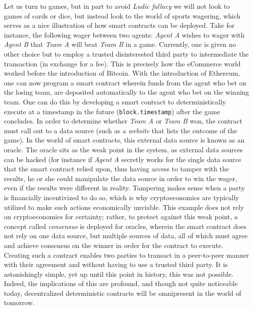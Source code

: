 \documentclass{article}
\begin{document}
Let us turn to games, but in part to avoid \textit{Ludic fallacy} we will not look to games of cards or dice, but instead look to the world of sports wagering, which serves as a nice illustration of how smart contracts can be deployed. Take for instance, the following wager between two agents: \textit{Agent A} wishes to wager with \textit{Agent B} that \textit{Team A} will beat \textit{Team B} in a game. Currently, one is given no other choice but to employ a trusted disinterested third party to intermediate the transaction (in exchange for a fee). This is precisely how the eCommerce world worked before the introduction of Bitcoin. With the introduction of Ethereum, one can now program a smart contract wherein funds from the agent who bet on the losing team, are deposited automatically to the agent who bet on the winning team. One can do this by developing a smart contract to deterministically execute at a timestamp in the future (\texttt{block.timestamp}) after the game concludes. In order to determine whether \textit{Team A} or \textit{Team B} won, the contract must call out to a data source (such as a \textit{website} that lists the outcome of the game). In the world of smart contracts, this external data source is known as an \gls{oracle}. The oracle sits as the weak point in the system, as external data sources can be hacked (for instance if \textit{Agent A} secretly works for the single data source that the smart contract relied upon, thus having access to tamper with the results, he or she could manipulate the data source in order to win the wager, even if the results were different in reality. Tampering makes sense when a party is financially incentivized to do so, which is why cryptoeconomics are typically utilized to make such actions economically unviable. This example does not rely on cryptoeconomics for certainty; rather, to protect against this weak point, a concept called \textit{consensus} is deployed for oracles, wherein the smart contract does not rely on one data source, but multiple sources of data, all of which must agree and achieve consensus on the winner in order for the contract to execute. Creating such a contract enables two parties to transact in a peer-to-peer manner with their agreement and without having to use a trusted third party. It is astonishingly simple, yet up until this point in history, this was not possible. Indeed, the implications of this are profound, and though not quite noticeable today, decentralized deterministic contracts will be omnipresent in the world of tomorrow.
\end{document}
